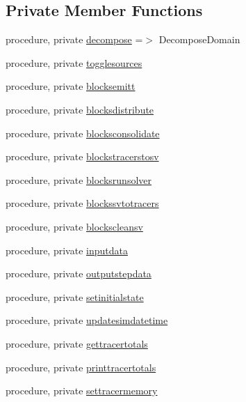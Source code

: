 \subsection*{Private Member Functions}
\begin{DoxyCompactItemize}
\item 
procedure, private \mbox{\hyperlink{structsimulation__mod_1_1simulation__class_a559d8d450db2c6b568cb6e0e4dbab350}{decompose}} =$>$ Decompose\+Domain
\item 
procedure, private \mbox{\hyperlink{structsimulation__mod_1_1simulation__class_a2394700a952ccf667b61d53764c73a54}{togglesources}}
\item 
procedure, private \mbox{\hyperlink{structsimulation__mod_1_1simulation__class_a6e740eee52324299ca5f6acd98d0c657}{blocksemitt}}
\item 
procedure, private \mbox{\hyperlink{structsimulation__mod_1_1simulation__class_a06672383d5978e81af6836eb6ebfd46a}{blocksdistribute}}
\item 
procedure, private \mbox{\hyperlink{structsimulation__mod_1_1simulation__class_acc64fd9769d45473cb6cc2ce12471c5a}{blocksconsolidate}}
\item 
procedure, private \mbox{\hyperlink{structsimulation__mod_1_1simulation__class_ad03b37cbdf652e29aaeb3b39bed32661}{blockstracerstosv}}
\item 
procedure, private \mbox{\hyperlink{structsimulation__mod_1_1simulation__class_aa4e34759252b0517c37c79c95ece1167}{blocksrunsolver}}
\item 
procedure, private \mbox{\hyperlink{structsimulation__mod_1_1simulation__class_a3d1841e43f69c4e5c705244c080af873}{blockssvtotracers}}
\item 
procedure, private \mbox{\hyperlink{structsimulation__mod_1_1simulation__class_a468cbc4545886a696123087bfaf42de4}{blockscleansv}}
\item 
procedure, private \mbox{\hyperlink{structsimulation__mod_1_1simulation__class_af3d29e42c561074ea7048db65e6878e1}{inputdata}}
\item 
procedure, private \mbox{\hyperlink{structsimulation__mod_1_1simulation__class_aaef8771dbe443c43b1355437bfa9ef4a}{outputstepdata}}
\item 
procedure, private \mbox{\hyperlink{structsimulation__mod_1_1simulation__class_aeb84b150c76e399c3dc33fbc3f7874ae}{setinitialstate}}
\item 
procedure, private \mbox{\hyperlink{structsimulation__mod_1_1simulation__class_a4b705d6b8829ece4018bde0dbadd0477}{updatesimdatetime}}
\item 
procedure, private \mbox{\hyperlink{structsimulation__mod_1_1simulation__class_ab22e46320d4a3dd0f2739894d1165a85}{gettracertotals}}
\item 
procedure, private \mbox{\hyperlink{structsimulation__mod_1_1simulation__class_a8ddba2b86c2137f5dfc7fcd301badd66}{printtracertotals}}
\item 
procedure, private \mbox{\hyperlink{structsimulation__mod_1_1simulation__class_a7cabf864e327d6e35f6cb7bd85b1db6a}{settracermemory}}
\end{DoxyCompactItemize}
